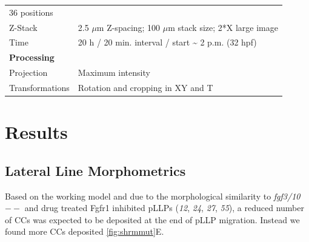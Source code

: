 \documentclass[11pt,singlespacinge,twoside]{reedthesis} %
\begin{document}
\begin{longtable}[]{@{}ll@{}}
\begin{minipage}[t]{0.73\columnwidth}
36 positions\strut
\end{minipage}\tabularnewline
\begin{minipage}[t]{0.21\columnwidth}\raggedright
Z-Stack\strut
\end{minipage} & \begin{minipage}[t]{0.73\columnwidth}\raggedright
2.5 \(\mu\)m Z-spacing; 100 \(\mu\)m stack size; 2*X large image\strut
\end{minipage}\tabularnewline
\begin{minipage}[t]{0.21\columnwidth}\raggedright
Time\strut
\end{minipage} & \begin{minipage}[t]{0.73\columnwidth}\raggedright
20 h / 20 min. interval / start \textasciitilde{} 2 p.m. (32 hpf)\strut
\end{minipage}\tabularnewline
\begin{minipage}[t]{0.21\columnwidth}\raggedright
\textbf{Processing}\strut
\end{minipage} & \begin{minipage}[t]{0.73\columnwidth}\raggedright
\strut
\end{minipage}\tabularnewline
\begin{minipage}[t]{0.21\columnwidth}\raggedright
Projection\strut
\end{minipage} & \begin{minipage}[t]{0.73\columnwidth}\raggedright
Maximum intensity\strut
\end{minipage}\tabularnewline
\begin{minipage}[t]{0.21\columnwidth}\raggedright
Transformations\strut
\end{minipage} & \begin{minipage}[t]{0.73\columnwidth}\raggedright
Rotation and cropping in XY and T\strut
\end{minipage}\tabularnewline
\bottomrule
\end{longtable}
\hypertarget{res}{%
\chapter{Results}\label{res}}

\hypertarget{lateral-line-morphometrics}{%
\section{Lateral Line Morphometrics}\label{lateral-line-morphometrics}}

Based on the working model and due to the morphological similarity to \emph{fgf3/10}\(--\) and drug treated Fgfr1 inhibited pLLPs (\emph{12}, \emph{24}, \emph{27}, \emph{55}), a reduced number of CCs was expected to be deposited at the end of pLLP migration. Instead we found more CCs deposited \ref{fig:shrmmut}E.
\end{document}
